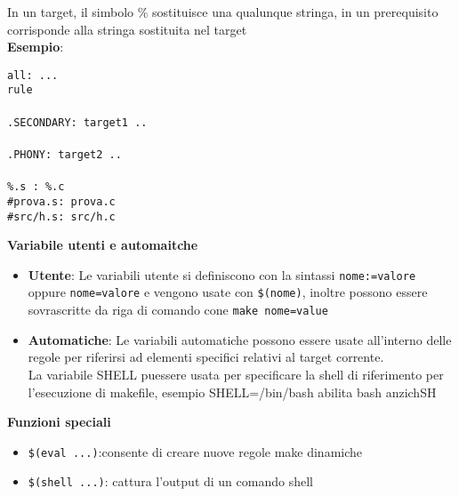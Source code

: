 \begin{flushleft}
\begin{flushleft}
\begin{flushleft}
      In un target, il simbolo \% sostituisce una qualunque stringa, in un prerequisito
      corrisponde alla stringa sostituita nel target\\
      \textbf{Esempio}:
      \begin{flushleft}
        \texttt{all: ... \\ 
                \tab rule \\ 
                \tab \\ 
                .SECONDARY: target1 .. \\
                \tab \\
                .PHONY: target2 ..\\
                \tab \\ 
                \%.s : \%.c \\ 
                \tab \#prova.s: prova.c \\
                \tab \#src/h.s: src/h.c} 
      \end{flushleft}
    \end{flushleft}
    \begin{flushleft}
      \textbf{Variabile utenti e automaitche}\par 
      \begin{itemize}
        \item \textbf{Utente}: Le variabili utente si definiscono con la sintassi 
              \texttt{nome:=valore} oppure \texttt{nome=valore} e vengono usate 
              con \texttt{\$(nome)}, inoltre possono essere sovrascritte da riga di 
              comando cone \texttt{make nome=value}
        \item \textbf{Automatiche}: Le variabili automatiche possono essere usate all'interno 
              delle regole per riferirsi ad elementi specifici relativi al target corrente. \\
              La variabile SHELL pu\aco essere usata per specificare la shell di riferimento 
              per l'esecuzione di makefile, esempio SHELL=/bin/bash abilita bash anzich\ace SH
      \end{itemize}
    \end{flushleft}
    \begin{flushleft}
      \textbf{Funzioni speciali}\\
      \begin{itemize}
        \item \texttt{\$(eval ...)}:consente di creare nuove regole make dinamiche
        \item \texttt{\$(shell ...)}: cattura l'output di un comando shell

\end{itemize}
\end{flushleft}
\end{flushleft}
\end{flushleft}
